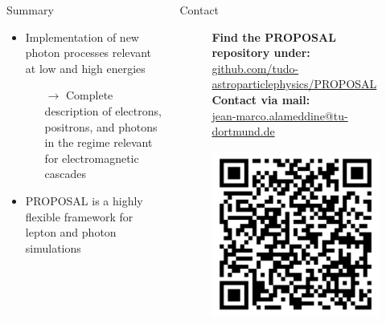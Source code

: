 \documentclass[t]{beamer}
\begin{document}
  \begin{columns}[onlytextwidth]%
    \begin{column}{0.4\textwidth}%
      \begin{block}[equal height group=Z]{Summary}%
        \begin{itemize}
          \item Implementation of new photon processes relevant at low and high energies
          \begin{itemize}
            \item[$\rightarrow$] Complete description of electrons, positrons, and photons in the regime relevant for electromagnetic cascades
          \end{itemize}
          \item PROPOSAL is a highly flexible framework for lepton and photon simulations
        \end{itemize}
      \end{block}
    \end{column}
    \begin{column}{0.4\textwidth}%
      \begin{block}[equal height group=Z]{Contact}%
        \begin{center}
          \begin{figure}[ht]
            \begin{minipage}[ht]{0.75\linewidth}
              \textbf{Find the PROPOSAL repository under:}\\ \url{github.com/tudo-astroparticlephysics/PROPOSAL} \vspace{0.5em}\\
              \textbf{Contact via mail:}\\ \href{mailto:me@jean-marco.alameddine@tu-dortmund.de}{jean-marco.alameddine@tu-dortmund.de} 
            \end{minipage}
            \begin{minipage}[ht]{0.24\linewidth}
              \centering
                \includegraphics[width=0.66\linewidth, valign=t]{images/qr_proposal.png}
            \end{minipage}
          \end{figure}
        \end{center}
      \end{block}
    \end{column}
    \end{columns}
\end{document}
